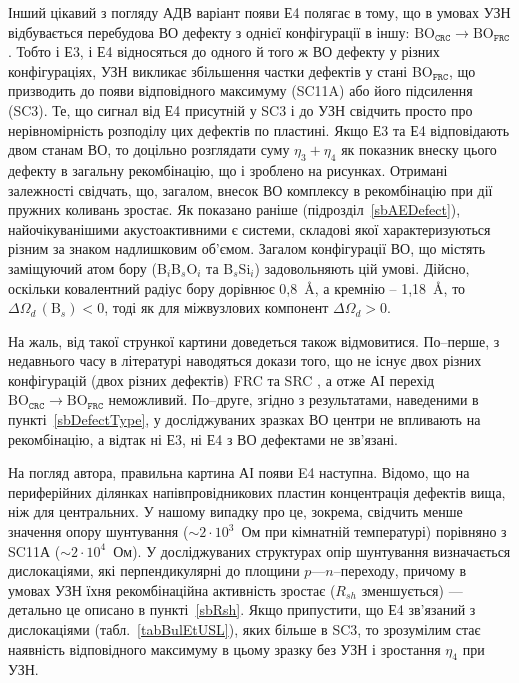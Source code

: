 Інший цікавий з погляду АДВ варіант появи Е4 полягає в тому, що в умовах УЗН відбувається
перебудова ВО дефекту з однієї конфігурації в іншу: $\mbox{BO}_\mathtt{CRC} \rightarrow \mbox{BO}_\mathtt{FRC}$.
Тобто і Е3, і Е4 відносяться до одного й того ж ВО дефекту у різних конфігураціях,
УЗН викликає збільшення частки дефектів у стані  BO$_\mathtt{FRC}$, що призводить до появи відповідного максимуму (SC11A) або його підсилення (SC3).
Те, що сигнал від Е4 присутній у SC3 і до УЗН свідчить просто про нерівномірність розподілу цих дефектів по пластині.
Якщо Е3 та Е4 відповідають двом станам ВО, то доцільно розглядати суму $\eta_3+\eta_4$ як показник внеску цього дефекту в загальну рекомбінацію, що і зроблено на рисунках.
Отримані залежності свідчать, що, загалом, внесок ВО комплексу в рекомбінацію при дії пружних коливань зростає.
Як показано раніше (підрозділ~\ref{sbAEDefect}), найочікуванішими акустоактивними  є системи, складові якої характеризуються різним за знаком надлишковим об'ємом.
Загалом конфігурації ВО, що містять заміщуючий атом бору (B$_i$B$_s$O$_i$ та B$_s$Si$_i$) задовольняють цій умові.
Дійсно, оскільки ковалентний радіус бору дорівнює 0,8~{\AA}, а кремнію -- 1,18~{\AA},
то $\Delta\Omega_d\,(\mbox{B}_s)<0$,
тоді як для міжвузлових компонент $\Delta\Omega_d>0$.

На жаль, від такої стрункої картини доведеться також відмовитися.
По--перше, з недавнього часу в літературі наводяться докази того, що не існує двох
різних конфігурацій  (двох різних дефектів) FRC та SRC \cite{BOSingle:Voronkov,BO3i,BOSingle:SEMSS2017,Kim},
а отже АІ перехід $\mbox{BO}_\mathtt{CRC} \rightarrow \mbox{BO}_\mathtt{FRC}$ неможливий.
По--друге, згідно з результатами, наведеними в пункті~\ref{sbDefectType},
у досліджуваних зразках ВО центри не впливають на рекомбінацію,
а відтак ні Е3, ні Е4 з ВО дефектами не зв'язані.


На погляд автора, правильна картина АІ появи E4 наступна.
Відомо, що на периферійних ділянках напівпровідникових пластин концентрація дефектів вища,
ніж для центральних.
У нашому випадку про це, зокрема, свідчить менше значення  опору шунтування ($\sim2\cdot10^{3}$~Ом при кімнатній температурі) порівняно з SC11А ($\sim2\cdot10^{4}$~Ом).
У досліджуваних структурах  опір шунтування визначається дислокаціями, які перпендикулярні до площини $p$---$n$--переходу, причому в умовах УЗН їхня рекомбінаційна активність зростає ($R_{sh}$ зменшується) --- детально це описано в пункті~\ref{sbRsh}.
Якщо припустити, що Е4 зв'язаний з дислокаціями (табл.~\ref{tabBulEtUSL}), яких більше в SC3, то зрозумілим стає наявність відповідного максимуму в цьому зразку без УЗН і зростання $\eta_4$ при УЗН.

